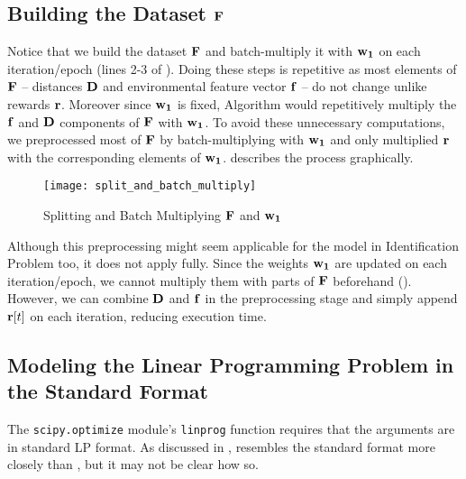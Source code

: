 \subsection{Building the Dataset $\mathbf{F}$} \label{app:Building the Dataset F}
Notice that we build the dataset $\mathbf{F}$ and batch-multiply it with $\mathbf{w_1}$ on each iteration/epoch (lines 2-3 of ). Doing these steps is repetitive as most elements of $\mathbf{F}$ -- distances $\mathbf{D}$ and environmental feature vector $\mathbf{f}$ -- do not change unlike rewards $\mathbf{r}$. Moreover since $\mathbf{w_1}$ is fixed, Algorithm  would repetitively multiply the $\mathbf{f}$ and $\mathbf{D}$ components of $\mathbf{F}$ with $\mathbf{w_1}$. To avoid these unnecessary computations, we preprocessed most of $\mathbf{F}$ by batch-multiplying with $\mathbf{w_1}$ and only multiplied $\mathbf{r}$ with the corresponding elements of $\mathbf{w_1}$.  describes the process graphically.
\begin{figure}[!htbp]
    \centering
    \texttt{[image: split\_and\_batch\_multiply]}
    \caption{Splitting and Batch Multiplying $\mathbf{F}$ and $\mathbf{w_1}$}
    \label{fig:Splitting and Batch Multiplying F and w1}
\end{figure}    
Although this preprocessing might seem applicable for the model in Identification Problem too, it does not apply fully. Since the weights $\mathbf{w_1}$ are updated on each iteration/epoch, we cannot multiply them with parts of $\mathbf{F}$ beforehand (). However, we can combine $\mathbf{D}$ and $\mathbf{f}$ in the preprocessing stage and simply append $\mathbf{r}[t]$ on each iteration, reducing execution time.

\subsection{Modeling the Linear Programming Problem in the Standard Format} \label{app:Modeling the Linear Programming Problem in the Standard Format}
The \texttt{scipy.optimize} module's \texttt{linprog} function requires that the arguments are in standard LP format. As discussed in ,  resembles the standard format more closely than , but it may not be clear how so.

